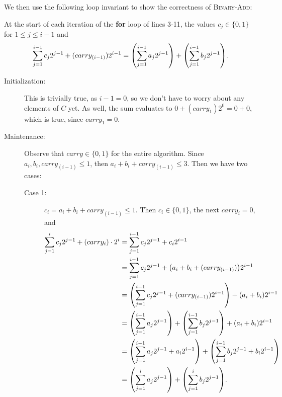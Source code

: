 \documentclass[Chapter02]{subfiles}
\begin{document}
\begin{enumerate}[leftmargin=\labelsep]
\begin{answer}
			We then use the following loop invariant to show the correctness of \textsc{Binary-Add}:

			\begin{addmargin}[2em]{2em}
				At the start of each iteration of the \textbf{for} loop of lines 3-11, the values $c_j \in \{0,1\}$ for $1 \leq j \leq i - 1$ and
				\[
					\sum_{j = 1}^{i - 1} c_j2^{j - 1} + (carry_{(i - 1)})2^{i-1} = \qty(\sum_{j = 1}^{i - 1} a_j 2^{j - 1}) + \qty(\sum_{j = 1}^{i - 1} b_j 2^{j - 1}).
				\]
			\end{addmargin}

			\begin{description}
				\item[Initialization:] This is trivially true, as $i - 1 = 0$, so we don't have to worry about any elements of $C$ yet. As well, the sum evaluates to $0 + (carry_1)2^0 = 0 + 0$, which is true, since $carry_1 = 0$.

				\item[Maintenance:] Observe that $carry \in \{0,1\}$ for the entire algorithm. Since $a_i, b_i, carry_{(i - 1)} \leq 1$, then $a_i + b_i + carry_{(i - 1)} \leq 3$. Then we have two cases:
				\begin{description}
					\item[Case 1:] $c_i = a_i + b_i + carry_{(i - 1)} \leq 1$. Then $c_i \in \{0, 1\}$, the next $carry_i = 0$, and
					\begin{align*}
						\sum_{j = 1}^{i} c_j2^{j - 1} + (carry_i) \cdot 2^{i} &= \sum_{j = 1}^{i - 1} c_j2^{j - 1} + c_i2^{i - 1}\\
							&= \sum_{j = 1}^{i - 1} c_j2^{j - 1} + \qty(a_i + b_i + (carry_{(i - 1)}))2^{i - 1}\\
							&= \qty(\sum_{j = 1}^{i - 1} c_j2^{j - 1} + (carry_{(i - 1)})2^{i - 1}) + (a_i + b_i)2^{i - 1}\\
							&= \qty(\sum_{j = 1}^{i - 1} a_j 2^{j - 1}) + \qty(\sum_{j = 1}^{i - 1} b_j 2^{j - 1}) + (a_i + b_i)2^{i - 1}\\
							&= \qty(\sum_{j = 1}^{i - 1} a_j 2^{j - 1} + a_i2^{i - 1}) + \qty(\sum_{j = 1}^{i - 1} b_j 2^{j - 1} + b_i2^{i-1})\\
							&= \qty(\sum_{j = 1}^i a_j 2^{j - 1}) + \qty(\sum_{j = 1}^i b_j 2^{j - 1}).
					\end{align*}


\end{description}
\end{description}
\end{answer}
\end{enumerate}
\end{document}
